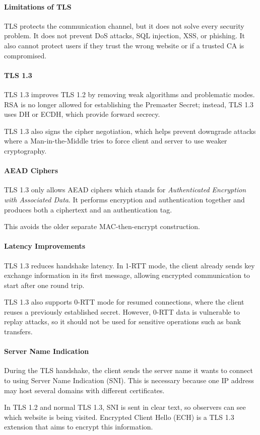 \paragraph{Limitations of TLS}

TLS protects the communication channel, but it does not solve every
security problem. It does not prevent DoS attacks, SQL injection, XSS, or
phishing. It also cannot protect users if they trust the wrong website or
if a trusted CA is compromised.

\paragraph{TLS 1.3}

TLS 1.3 improves TLS 1.2 by removing weak algorithms and problematic
modes. RSA is no longer allowed for establishing the Premaster Secret;
instead, TLS 1.3 uses DH or ECDH, which provide forward secrecy.

TLS 1.3 also signs the cipher negotiation, which helps prevent downgrade
attacks where a Man-in-the-Middle tries to force client and server to use
weaker cryptography.

\paragraph{AEAD Ciphers}

TLS 1.3 only allows AEAD ciphers which stands for \emph{Authenticated Encryption with
Associated Data}. It performs encryption and authentication together and
produces both a ciphertext and an authentication tag.

This avoids the older separate MAC-then-encrypt construction.

\paragraph{Latency Improvements}

TLS 1.3 reduces handshake latency. In 1-RTT mode, the client already
sends key exchange information in its first message, allowing encrypted
communication to start after one round trip.

TLS 1.3 also supports 0-RTT mode for resumed connections, where the
client reuses a previously established secret. However, 0-RTT data is
vulnerable to replay attacks, so it should not be used for sensitive
operations such as bank transfers.

\paragraph{Server Name Indication}

During the TLS handshake, the client sends the server name it wants to
connect to using Server Name Indication (SNI). This is necessary because
one IP address may host several domains with different certificates.

In TLS 1.2 and normal TLS 1.3, SNI is sent in clear text, so observers
can see which website is being visited. Encrypted Client Hello (ECH) is a
TLS 1.3 extension that aims to encrypt this information.

